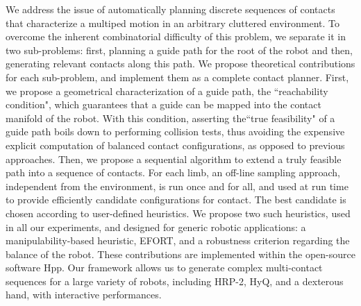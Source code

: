 We address the issue of automatically planning discrete sequences of contacts
that characterize a multiped motion in an arbitrary cluttered environment.
To overcome the inherent combinatorial difficulty of this problem, we separate it
in two sub-problems: first, planning a guide path for the root of the robot and
then, generating relevant contacts along this path.
We propose theoretical contributions for each sub-problem, and implement them
as a complete contact planner. 
First, we propose a geometrical characterization of a guide path, the ``reachability condition", which guarantees that a
guide can be mapped into the contact manifold of the robot. With this condition, asserting the``true feasibility" 
of a guide path boils down to performing collision tests, thus avoiding the expensive explicit computation of balanced contact configurations, as opposed to previous approaches.
Then, we propose a sequential algorithm to extend a truly feasible path into a sequence of contacts. For each limb, an off-line sampling approach,
independent from the environment, is run once and for all, and used at run time to provide efficiently candidate configurations for contact.
The best candidate is chosen according to user-defined heuristics. We propose two such heuristics, used in all our experiments, and 
designed for generic robotic applications: a manipulability-based heuristic, EFORT, and a robustness criterion regarding the balance of the robot.
These contributions are implemented within the open-source software Hpp. Our framework allows us to generate complex multi-contact sequences for a large
variety of robots, including HRP-2, HyQ, and a dexterous hand, with interactive performances.
